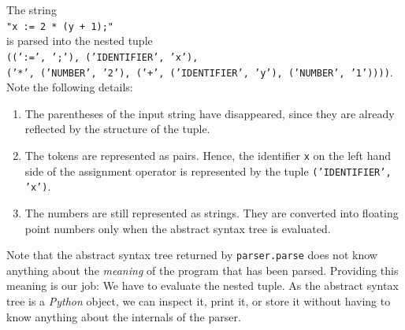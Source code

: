 \exampleEng
The string
\\[0.2cm]
\hspace*{1.3cm}
\texttt{"x := 2 * (y + 1);"}
\\[0.2cm]
is parsed into the nested tuple
\\[0.2cm]
\hspace*{0.3cm}
\texttt{((':=', ';'), ('IDENTIFIER', 'x'),}
\\
\hspace*{0.8cm}
\texttt{('*', ('NUMBER', '2'), ('+', ('IDENTIFIER', 'y'), ('NUMBER', '1'))))}.
\\[0.2cm]
Note the following details:
\begin{enumerate}
\item The parentheses of the input string have disappeared, since they are already reflected by the
      structure of the tuple.
\item The tokens are represented as pairs.  Hence, the identifier \texttt{x} on the left hand side of the
      assignment operator is represented by the tuple \texttt{('IDENTIFIER', 'x')}.
\item The numbers are still represented as strings.  They are converted into floating point numbers only
      when the abstract syntax tree is evaluated. \eox
\end{enumerate}

\noindent
Note that the abstract syntax tree returned by \texttt{parser.parse} does not know anything about the
\emph{meaning} of the program that has been parsed.  Providing this meaning is our job:  We have to evaluate
the nested tuple.  As the abstract syntax tree is a  \textsl{Python} object, we can inspect it, print
it, or store it without having to know anything about the internals of the parser.

